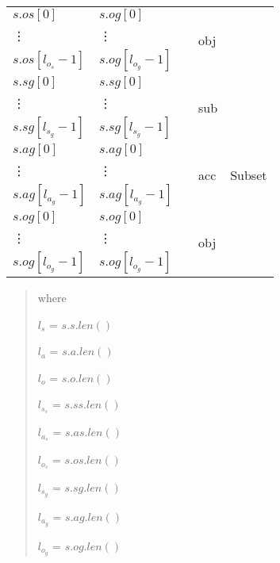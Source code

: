 \documentclass[10pt, twocolumn]{article}
\begin{document}
\begin{tabular}[t]{|l|l|l|l|l|}
            $s.os[0]$ &
            $s.og[0]$ &
            &
            \multirow{3}{*}{\begin{sideways}obj\end{sideways}} & \\
            \vdots & \vdots & & & \\
            $s.os[l_{o_{s}} - 1]$ & $s.og[l_{o_{g}} - 1]$ & & & \\
            \hline
            $s.sg[0]$ &
            $s.sg[0]$ &
            &
            \multirow{3}{*}{\begin{sideways}sub\end{sideways}} &
            \multirow{9}{*}{\begin{sideways}Subset\end{sideways}} \\
            \vdots & \vdots & & & \\
            $s.sg[l_{s_{g}} - 1]$ & $s.sg[l_{s_{g}} - 1]$ & & & \\
            \cline{1-4}
            $s.ag[0]$ &
            $s.ag[0]$ &
            &
            \multirow{3}{*}{\begin{sideways}acc\end{sideways}} & \\
            \vdots & \vdots & & & \\
            $s.ag[l_{a_{g}} - 1]$ & $s.ag[l_{a_{g}} - 1]$ & & & \\
            \cline{1-4}
            $s.og[0]$ &
            $s.og[0]$ &
            &
            \multirow{3}{*}{\begin{sideways}obj\end{sideways}} & \\
            \vdots & \vdots & & & \\
            $s.og[l_{o_{g}} - 1]$ & $s.og[l_{o_{g}} - 1]$ & & & \\
            \hline
          \end{tabular}

          \begin{quote}
            where

            $l_{s}$ = $s.s.len()$

            $l_{a}$ = $s.a.len()$

            $l_{o}$ = $s.o.len()$

            $l_{s_{s}}$ = $s.ss.len()$

            $l_{a_{s}}$ = $s.as.len()$

            $l_{o_{s}}$ = $s.os.len()$

            $l_{s_{g}}$ = $s.sg.len()$

            $l_{a_{g}}$ = $s.ag.len()$

            $l_{o_{g}}$ = $s.og.len()$
          \end{quote}
\end{document}
